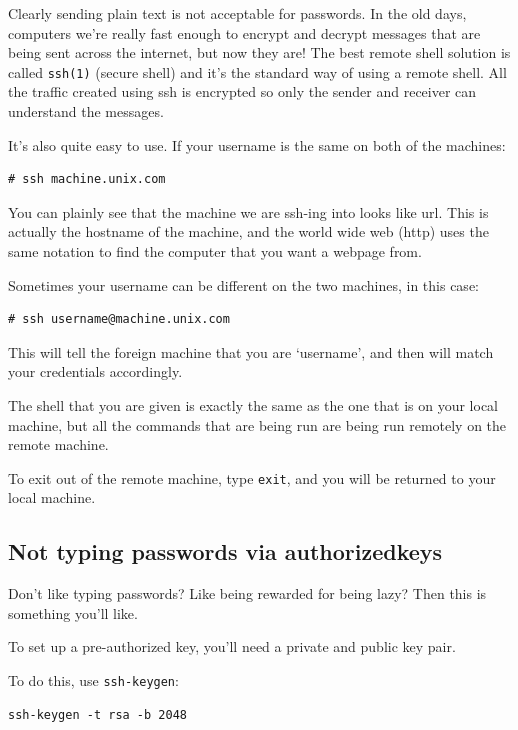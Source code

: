 Clearly sending plain text is not acceptable for passwords. In the old days, computers we're
really fast enough to encrypt and decrypt messages that are being sent across the internet,
but now they are! The best remote shell solution is called {\tt ssh(1)} (secure shell) and it's 
the standard way of using a remote shell. All the traffic created using ssh is encrypted so only the 
sender and receiver can understand
the messages. 

It's also quite easy to use. If your username is the same on both of the machines:

\begin{verbatim}
# ssh machine.unix.com
\end{verbatim}    

You can plainly see that the machine we are ssh-ing into looks like url. This is 
actually the hostname of the machine, and the world wide web (http) uses the same
notation to find the computer that you want a webpage from.

Sometimes your username can be different on the two machines, in this case:

\begin{verbatim}
# ssh username@machine.unix.com 
\end{verbatim}

This will tell the foreign machine that you are `username', and then will
match your credentials accordingly. 

The shell that you are given is exactly the same as the one that is on your local 
machine, but all the commands that are being run are being run 
remotely on the remote machine.

To exit out of the remote machine, type {\tt exit}, and you will be returned 
to your local machine.  

\subsection{Not typing passwords via authorized\textunderscore keys}
\label{subsection:sshkeys}
Don't like typing passwords? Like being rewarded for being lazy? Then this 
is something you'll like.

To set up a pre-authorized key, you'll need a private and public key pair.

To do this, use {\tt ssh-keygen}:

\begin{verbatim}
ssh-keygen -t rsa -b 2048
\end{verbatim}

